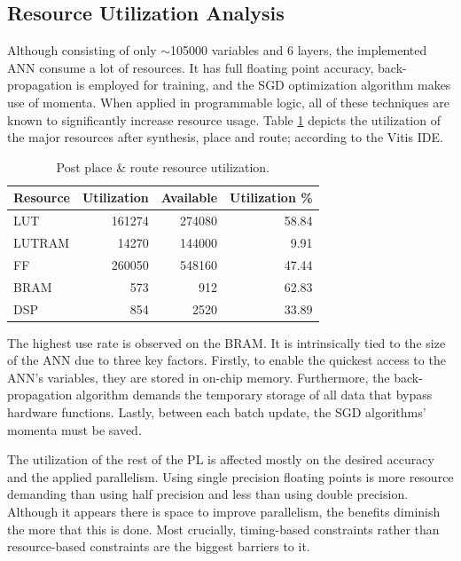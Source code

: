 \subsection{Resource Utilization Analysis}
Although consisting of only $\sim$105000 variables and 6 layers, the implemented ANN consume a lot of resources. It has full floating point accuracy, back-propagation is employed for training, and the SGD optimization algorithm makes use of momenta. When applied in programmable logic, all of these techniques are known to significantly increase resource usage. Table \ref{table: Resource Utilization} depicts the utilization of the major resources after synthesis, place and route; according to the Vitis IDE. %
\begin{table}[H]
    \center
    \begin{tabular}
        { | l | r | r | r | }
        \hline
        Resource & Utilization & Available & Utilization \%\\
        \hline
        LUT      & 161274 & 274080 & 58.84\\
        LUTRAM   &  14270 & 144000 &  9.91\\
        FF       & 260050 & 548160 & 47.44\\
        BRAM     &    573 &    912 & 62.83\\
        DSP      &    854 &   2520 & 33.89\\
        \hline
    \end{tabular}
    \caption[Resource Utilization]{Post place \& route resource utilization.}
    \label{table: Resource Utilization}
\end{table}
The highest use rate is observed on the BRAM. It is intrinsically tied to the size of the ANN due to three key factors. Firstly, to enable the quickest access to the ANN's variables, they are stored in on-chip memory. Furthermore, the back-propagation algorithm demands the temporary storage of all data that bypass hardware functions. Lastly, between each batch update, the SGD algorithms' momenta must be saved. %

The utilization of the rest of the PL is affected mostly on the desired accuracy and the applied parallelism. Using single precision floating points is more resource demanding than using half precision and less than using double precision. Although it appears there is space to improve parallelism, the benefits diminish the more that this is done. Most crucially, timing-based constraints rather than resource-based constraints are the biggest barriers to it. %

